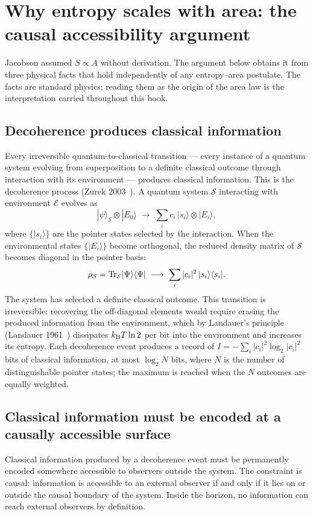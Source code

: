 \section{Why entropy scales with area: the causal accessibility argument}\label{sec:bk_area}
Jacobson assumed $S\propto A$ without derivation. The argument below obtains it from three physical facts that hold independently of any
entropy--area postulate. The facts are standard physics; reading them as the origin of the area law is the interpretation carried throughout this book. \interp

\subsection{Decoherence produces classical information}
Every irreversible quantum-to-classical transition --- every instance of a quantum system evolving from superposition to a definite classical outcome
through interaction with its environment --- produces classical information. This is the decoherence process (Zurek 2003~\cite{Zurek2003}). A quantum system
$\mathcal S$ interacting with environment $\mathcal E$ evolves as
\begin{equation}
|\psi\rangle_{\mathcal S}\otimes|E_0\rangle\;\longrightarrow\;\sum_i c_i\,|s_i\rangle\otimes|E_i\rangle,\label{eq:bk_decoherence}
\end{equation}
where $\{|s_i\rangle\}$ are the pointer states selected by the interaction. When the environmental states $\{|E_i\rangle\}$ become orthogonal, the reduced
density matrix of $\mathcal S$ becomes diagonal in the pointer basis:
\begin{equation}
\rho_{\mathcal S}={\rm Tr}_{\mathcal E}|\Psi\rangle\langle\Psi|\;\longrightarrow\;\sum_i|c_i|^2\,|s_i\rangle\langle s_i|.\label{eq:bk_diagonal}
\end{equation}
The system has selected a definite classical outcome. This transition is irreversible: recovering the off-diagonal elements would require erasing the
produced information from the environment, which by Landauer's principle (Landauer 1961~\cite{Landauer1961}) dissipates $k_{\mathrm B} T\ln2$ per bit into the environment
and increases its entropy. Each decoherence event produces a record of $I=-\sum_i|c_i|^2\log_2|c_i|^2$ bits of classical information, at most
$\log_2N$ bits, where $N$ is the number of distinguishable pointer states; the maximum is reached when the $N$ outcomes are equally weighted. \derived

\subsection{Classical information must be encoded at a causally accessible surface}
Classical information produced by a decoherence event must be permanently encoded somewhere accessible to observers outside the system. The
constraint is causal: information is accessible to an external observer if and only if it lies on or outside the causal boundary of the system.
Inside the horizon, no information can reach external observers by definition.

